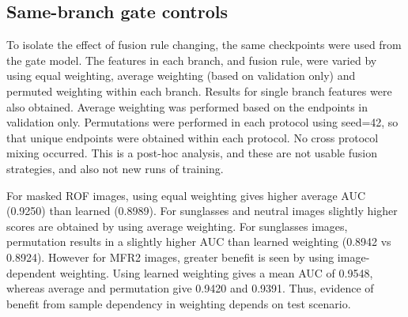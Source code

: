 \documentclass[10pt,lettersize,journal]{IEEEtran}
\begin{document}
\subsection{Same-branch gate controls}
To isolate the effect of fusion rule changing, the same checkpoints were used from the gate model. The features in each branch, and fusion rule, were varied by using equal weighting, average weighting (based on validation only) and permuted weighting within each branch. Results for single branch features were also obtained. Average weighting was performed based on the endpoints in validation only. Permutations were performed in each protocol using seed=42, so that unique endpoints were obtained within each protocol. No cross protocol mixing occurred. This is a post-hoc analysis, and these are not usable fusion strategies, and also not new runs of training.\par
\begin{table}[t]\centering
\caption{Average AUC values for fusion control, with same trained gate branch. Not separately trained M3 models.}
\label{tab:checked9}
\footnotesize\setlength{\tabcolsep}{2pt}
\ifdim\wd\uploadedtablebox>\columnwidth\resizebox{\columnwidth}{!}{\usebox{\uploadedtablebox}}\else\usebox{\uploadedtablebox}\fi
\end{table}
For masked ROF images, using equal weighting gives higher average AUC (0.9250) than learned (0.8989). For sunglasses and neutral images slightly higher scores are obtained by using average weighting. For sunglasses images, permutation results in a slightly higher AUC than learned weighting (0.8942 vs 0.8924). However for MFR2 images, greater benefit is seen by using image-dependent weighting. Using learned weighting gives a mean AUC of 0.9548, whereas average and permutation give 0.9420 and 0.9391. Thus, evidence of benefit from sample dependency in weighting depends on test scenario.\par
\end{document}
